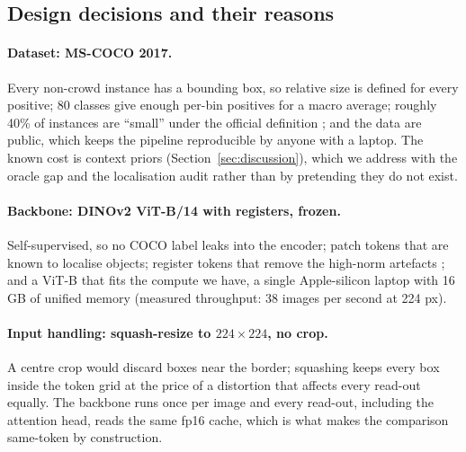 \documentclass[10pt,letterpaper,twocolumn]{article}
\begin{document}
\subsection{Design decisions and their reasons}
\paragraph{Dataset: MS-COCO 2017.}
Every non-crowd instance has a bounding box, so relative size is defined for every positive;
80 classes give enough per-bin positives for a macro average; roughly 40\% of instances are
``small'' under the official definition \citep{lin2014coco}; and the data are public, which
keeps the pipeline reproducible by anyone with a laptop. The known cost is context priors
(Section~\ref{sec:discussion}), which we address with the oracle gap and the localisation
audit rather than by pretending they do not exist.

\paragraph{Backbone: DINOv2 ViT-B/14 with registers, frozen.}
Self-supervised, so no COCO label leaks into the encoder; patch tokens that are known to
localise objects; register tokens that remove the high-norm artefacts
\citep{darcet2024registers}; and a ViT-B that fits the compute we have, a single
Apple-silicon laptop with 16 GB of unified memory (measured throughput: 38 images per second at 224 px).

\paragraph{Input handling: squash-resize to $224\times224$, no crop.}
A centre crop would discard boxes near the border; squashing keeps every box inside the token
grid at the price of a distortion that affects every read-out equally. The backbone runs once
per image and every read-out, including the attention head, reads the same fp16 cache, which
is what makes the comparison same-token by construction.
\end{document}
